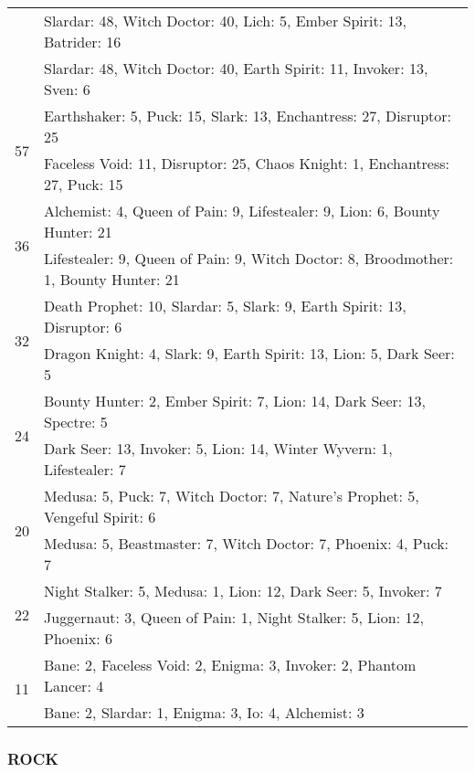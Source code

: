 \begin{table}[H]
\begin{tabular}{ | c | p{12.5cm} | }
& Slardar: 48, Witch Doctor: 40, Lich: 5, Ember Spirit: 13, Batrider: 16 \\
& Slardar: 48, Witch Doctor: 40, Earth Spirit: 11, Invoker: 13, Sven: 6 \\
\hline
\multirow{2}{*}{57}
& Earthshaker: 5, Puck: 15, Slark: 13, Enchantress: 27, Disruptor: 25 \\
& Faceless Void: 11, Disruptor: 25, Chaos Knight: 1, Enchantress: 27, Puck: 15 \\
\hline
\multirow{2}{*}{36}
& Alchemist: 4, Queen of Pain: 9, Lifestealer: 9, Lion: 6, Bounty Hunter: 21 \\
& Lifestealer: 9, Queen of Pain: 9, Witch Doctor: 8, Broodmother: 1, Bounty Hunter: 21 \\
\hline
\multirow{2}{*}{32}
& Death Prophet: 10, Slardar: 5, Slark: 9, Earth Spirit: 13, Disruptor: 6 \\
& Dragon Knight: 4, Slark: 9, Earth Spirit: 13, Lion: 5, Dark Seer: 5 \\
\hline
\multirow{2}{*}{24}
& Bounty Hunter: 2, Ember Spirit: 7, Lion: 14, Dark Seer: 13, Spectre: 5 \\
& Dark Seer: 13, Invoker: 5, Lion: 14, Winter Wyvern: 1, Lifestealer: 7 \\
\hline
\multirow{2}{*}{20}
& Medusa: 5, Puck: 7, Witch Doctor: 7, Nature's Prophet: 5, Vengeful Spirit: 6 \\
& Medusa: 5, Beastmaster: 7, Witch Doctor: 7, Phoenix: 4, Puck: 7 \\
\hline
\multirow{2}{*}{22}
& Night Stalker: 5, Medusa: 1, Lion: 12, Dark Seer: 5, Invoker: 7 \\
& Juggernaut: 3, Queen of Pain: 1, Night Stalker: 5, Lion: 12, Phoenix: 6 \\
\hline
\multirow{2}{*}{11}
& Bane: 2, Faceless Void: 2, Enigma: 3, Invoker: 2, Phantom Lancer: 4 \\
& Bane: 2, Slardar: 1, Enigma: 3, Io: 4, Alchemist: 3 \\
\hline
    \end{tabular}
    \caption{}
    \label{}
    \end{table}

\subsubsection*{ROCK}

